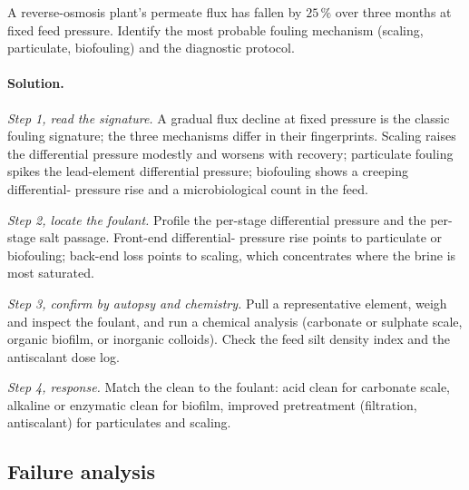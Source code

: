\begin{exercise}
A reverse-osmosis plant's permeate flux has fallen by $25\,\%$ over
three months at fixed feed pressure. Identify the most probable
fouling mechanism (scaling, particulate, biofouling) and the
diagnostic protocol.

\paragraph{Solution.}
\textit{Step 1, read the signature.} A gradual flux decline at fixed
pressure is the classic fouling signature; the three mechanisms differ
in their fingerprints. Scaling raises the differential pressure modestly
and worsens with recovery; particulate fouling spikes the lead-element
differential pressure; biofouling shows a creeping differential-
pressure rise and a microbiological count in the feed.

\textit{Step 2, locate the foulant.} Profile the per-stage differential
pressure and the per-stage salt passage. Front-end differential-
pressure rise points to particulate or biofouling; back-end loss points
to scaling, which concentrates where the brine is most saturated.

\textit{Step 3, confirm by autopsy and chemistry.} Pull a representative
element, weigh and inspect the foulant, and run a chemical analysis
(carbonate or sulphate scale, organic biofilm, or inorganic colloids).
Check the feed silt density index and the antiscalant dose log.

\textit{Step 4, response.} Match the clean to the foulant: acid clean
for carbonate scale, alkaline or enzymatic clean for biofilm, improved
pretreatment (filtration, antiscalant) for particulates and scaling.
\end{exercise}

\subsection*{Failure analysis}

